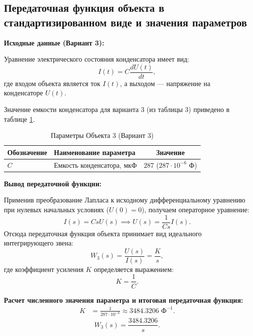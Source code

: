 \documentclass[12pt, a4paper]{article}
\begin{document}
\subsection{Передаточная функция объекта в стандартизированном виде и значения параметров}

\textbf{Исходные данные (Вариант 3):}

Уравнение электрического состояния конденсатора имеет вид:
\begin{equation}
    I(t) = C \frac{dU(t)}{dt},
\end{equation}
где входом объекта является ток $I(t)$, а выходом — напряжение на конденсаторе $U(t)$.

Значение емкости конденсатора для варианта 3 (из таблицы 3) приведено в таблице \ref{tab:obj3_params}.

\begin{table}[H]
\centering
\caption{Параметры Объекта 3 (Вариант 3)}
\label{tab:obj3_params}
\setlength{\tabcolsep}{10pt} 
\renewcommand{\arraystretch}{1.3} 
\begin{tabular}{@{} >{\raggedright\arraybackslash}p{3.5cm} >{\raggedright\arraybackslash}p{7.5cm} c @{}}
\toprule
\textbf{Обозначение} & \textbf{Наименование параметра} & \textbf{Значение} \\ \midrule
$C$ & Емкость конденсатора, $\text{мкФ}$ & $287$ ($287 \cdot 10^{-6} \text{ Ф}$) \\ \bottomrule
\end{tabular}
\end{table}

\textbf{Вывод передаточной функции:}

Применив преобразование Лапласа к исходному дифференциальному уравнению при нулевых начальных условиях ($U(0) = 0$), получаем операторное уравнение:
\begin{equation*}
    I(s) = C s U(s) \implies U(s) = \frac{1}{Cs} I(s).
\end{equation*}
Отсюда передаточная функция объекта принимает вид идеального интегрирующего звена:
\begin{equation}
    W_3(s) = \frac{U(s)}{I(s)} = \frac{K}{s},
\end{equation}
где коэффициент усиления $K$ определяется выражением:
\begin{equation*}
    K = \frac{1}{C}.
\end{equation*}

\textbf{Расчет численного значения параметра и итоговая передаточная функция:}
\begin{align*}
    K &= \frac{1}{287 \cdot 10^{-6}} \approx 3484.3206 \text{ Ф}^{-1}.
\end{align*}
\begin{equation}
    W_3(s) = \frac{3484.3206}{s}.
\end{equation}
\end{document}
